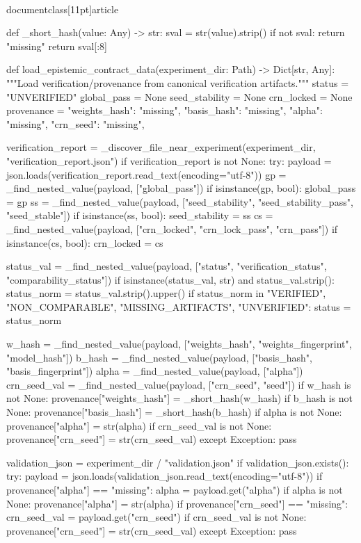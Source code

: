 \\documentclass[11pt]{article}
\begin{document}
\begin{CodeBlock}
def _short_hash(value: Any) -> str:
    sval = str(value).strip()
    if not sval:
        return "missing"
    return sval[:8]


def load_epistemic_contract_data(experiment_dir: Path) -> Dict[str, Any]:
    """Load verification/provenance from canonical verification artifacts."""
    status = "UNVERIFIED"
    global_pass = None
    seed_stability = None
    crn_locked = None
    provenance = {
        "weights_hash": "missing",
        "basis_hash": "missing",
        "alpha": "missing",
        "crn_seed": "missing",
    }

    verification_report = _discover_file_near_experiment(experiment_dir, "verification_report.json")
    if verification_report is not None:
        try:
            payload = json.loads(verification_report.read_text(encoding="utf-8"))
            gp = _find_nested_value(payload, ["global_pass"])
            if isinstance(gp, bool):
                global_pass = gp
            ss = _find_nested_value(payload, ["seed_stability", "seed_stability_pass", "seed_stable"])
            if isinstance(ss, bool):
                seed_stability = ss
            cs = _find_nested_value(payload, ["crn_locked", "crn_lock_pass", "crn_pass"])
            if isinstance(cs, bool):
                crn_locked = cs

            status_val = _find_nested_value(payload, ["status", "verification_status", "comparability_status"])
            if isinstance(status_val, str) and status_val.strip():
                status_norm = status_val.strip().upper()
                if status_norm in {"VERIFIED", "NON_COMPARABLE", "MISSING_ARTIFACTS", "UNVERIFIED"}:
                    status = status_norm

            w_hash = _find_nested_value(payload, ["weights_hash", "weights_fingerprint", "model_hash"])
            b_hash = _find_nested_value(payload, ["basis_hash", "basis_fingerprint"])
            alpha = _find_nested_value(payload, ["alpha"])
            crn_seed_val = _find_nested_value(payload, ["crn_seed", "seed"])
            if w_hash is not None:
                provenance["weights_hash"] = _short_hash(w_hash)
            if b_hash is not None:
                provenance["basis_hash"] = _short_hash(b_hash)
            if alpha is not None:
                provenance["alpha"] = str(alpha)
            if crn_seed_val is not None:
                provenance["crn_seed"] = str(crn_seed_val)
        except Exception:
            pass

    validation_json = experiment_dir / "validation.json"
    if validation_json.exists():
        try:
            payload = json.loads(validation_json.read_text(encoding="utf-8"))
            if provenance["alpha"] == "missing":
                alpha = payload.get("alpha")
                if alpha is not None:
                    provenance["alpha"] = str(alpha)
            if provenance["crn_seed"] == "missing":
                crn_seed_val = payload.get("crn_seed")
                if crn_seed_val is not None:
                    provenance["crn_seed"] = str(crn_seed_val)
        except Exception:
            pass


\end{CodeBlock}
\end{document}
